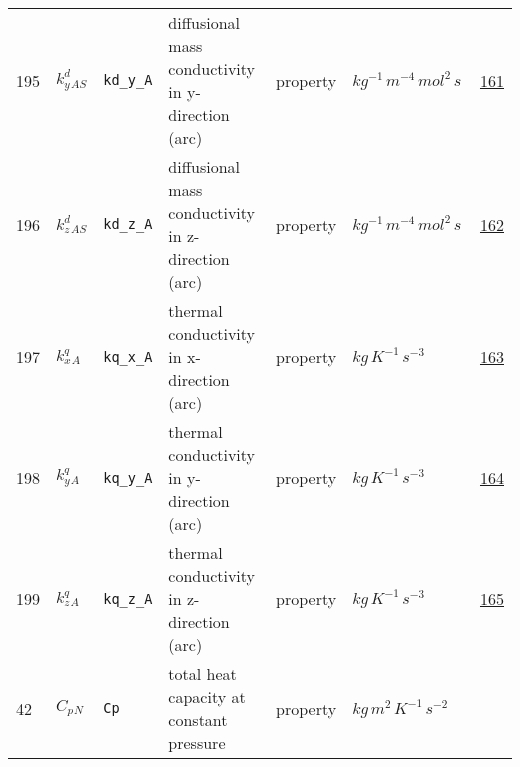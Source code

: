 \begin{longtable}{|p{1cm}|p{2.5cm}|p{4.5cm}|p{8cm}|p{3.0cm}|p{3cm}|p{1cm}|}
            195
             & \hypertarget{"v:195"}{ $ {{k^d_y}}{_{{A S}}} $}
             & \verb|kd_y_A|
             & diffusional mass conductivity in y-direction (arc)
             & \begin{lay}property \end{lay}
             & $ kg^{-1} \,m^{-4} \,mol^{2} \,s \, $
             &                 \hyperlink{"e:161"}{ 161 }
                 \\
            196
             & \hypertarget{"v:196"}{ $ {{k^d_z}}{_{{A S}}} $}
             & \verb|kd_z_A|
             & diffusional mass conductivity in z-direction (arc)
             & \begin{lay}property \end{lay}
             & $ kg^{-1} \,m^{-4} \,mol^{2} \,s \, $
             &                 \hyperlink{"e:162"}{ 162 }
                 \\
            197
             & \hypertarget{"v:197"}{ $ {{k^q_x}}{_{A}} $}
             & \verb|kq_x_A|
             & thermal conductivity in x-direction (arc)
             & \begin{lay}property \end{lay}
             & $ kg \,K^{-1} \,s^{-3} \, $
             &                 \hyperlink{"e:163"}{ 163 }
                 \\
            198
             & \hypertarget{"v:198"}{ $ {{k^q_y}}{_{A}} $}
             & \verb|kq_y_A|
             & thermal conductivity in y-direction (arc)
             & \begin{lay}property \end{lay}
             & $ kg \,K^{-1} \,s^{-3} \, $
             &                 \hyperlink{"e:164"}{ 164 }
                 \\
            199
             & \hypertarget{"v:199"}{ $ {{k^q_z}}{_{A}} $}
             & \verb|kq_z_A|
             & thermal conductivity in z-direction (arc)
             & \begin{lay}property \end{lay}
             & $ kg \,K^{-1} \,s^{-3} \, $
             &                 \hyperlink{"e:165"}{ 165 }
                 \\
            42
             & \hypertarget{"v:42"}{ $ {{C_p}}{_{N}} $}
             & \verb|Cp|
             & total heat capacity at constant pressure
             & \begin{lay}property \end{lay}
             & $ kg \,m^{2} \,K^{-1} \,s^{-2} \, $

\end{longtable}
